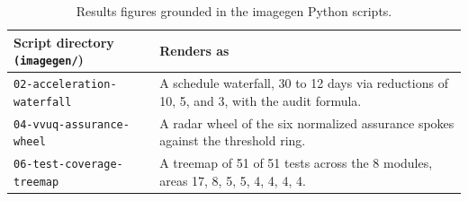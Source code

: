 

\begin{table}[H]
\caption{Results figures grounded in the imagegen Python scripts.}
\label{tab:results_figs}
\centering
\begin{tabularx}{\textwidth}{L{5.5cm} >{\raggedright\arraybackslash}X}
\toprule
\textbf{Script directory \texttt{(imagegen/})} & \textbf{Renders as} \\
\midrule
  \texttt{02-acceleration-waterfall} & A schedule waterfall, 30 to 12 days via reductions of 10, 5, and 3, with the audit formula. \\
  \texttt{04-vvuq-assurance-wheel} & A radar wheel of the six normalized assurance spokes against the threshold ring. \\
  \texttt{06-test-coverage-treemap} & A treemap of 51 of 51 tests across the 8 modules, areas 17, 8, 5, 5, 4, 4, 4, 4. \\
\bottomrule
\end{tabularx}
\end{table}
